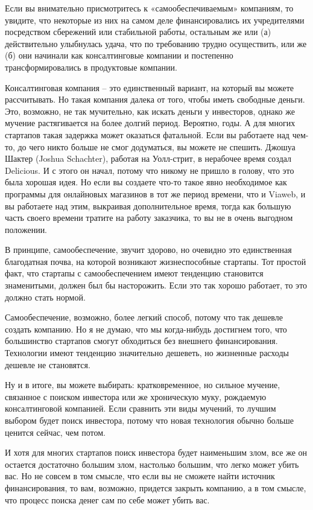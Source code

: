 \documentclass[ebook,12pt,oneside,openany]{memoir}
\begin{document}
Если вы внимательно присмотритесь к «самообеспечиваемым» компаниям, то
увидите, что некоторые из них на самом деле финансировались их
учредителями посредством сбережений или стабильной работы, остальным
же или (а) действительно улыбнулась удача, что по требованию трудно
осуществить, или же (б) они начинали как консалтинговые компании и
постепенно трансформировались в продуктовые компании.

Консалтинговая компания – это единственный вариант, на который вы
можете рассчитывать. Но такая компания далека от того, чтобы иметь
свободные деньги. Это, возможно, не так мучительно, как искать деньги
у инвесторов, однако же мучение растягивается на более долгий период.
Вероятно, годы. А для многих стартапов такая задержка может оказаться
фатальной. Если вы работаете над чем-то, до чего никто больше не смог
додуматься, вы можете не спешить. Джошуа Шактер (Joshua Schachter),
работая на Уолл-стрит, в нерабочее время создал Delicious. И с этого
он начал, потому что никому не пришло в голову, что это была хорошая
идея. Но если вы создаете что-то такое явно необходимое как программы
для онлайновых магазинов в тот же период времени, что и Viaweb, и вы
работаете над этим, выкраивая дополнительное время, тогда как большую
часть своего времени тратите на работу заказчика, то вы не в очень
выгодном положении.

В принципе, самообеспечение, звучит здорово, но очевидно это
единственная благодатная почва, на которой возникают жизнеспособные
стартапы. Тот простой факт, что стартапы с самообеспечением имеют
тенденцию становится знаменитыми, должен был бы насторожить. Если это
так хорошо работает, то это должно стать нормой.

Самообеспечение, возможно, более легкий способ, потому что так дешевле
создать компанию. Но я не думаю, что мы когда-нибудь достигнем того,
что большинство стартапов смогут обходиться без внешнего
финансирования. Технологии имеют тенденцию значительно дешеветь, но
жизненные расходы дешевле не становятся.

Ну и в итоге, вы можете выбирать: кратковременное, но сильное мучение,
связанное с поиском инвестора или же хроническую муку, рождаемую
консалтинговой компанией. Если сравнить эти виды мучений, то лучшим
выбором будет поиск инвестора, потому что новая технология обычно
больше ценится сейчас, чем потом.

И хотя для многих стартапов поиск инвестора будет наименьшим злом, все
же он остается достаточно большим злом, настолько большим, что легко
может убить вас. Но не совсем в том смысле, что если вы не сможете
найти источник финансирования, то вам, возможно, придется закрыть
компанию, а в том смысле, что процесс поиска денег сам по себе может
убить вас.
\end{document}
